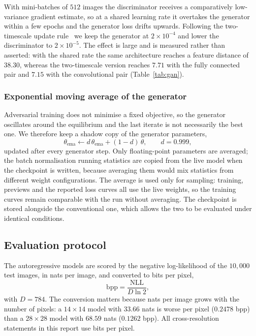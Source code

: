 \documentclass[11pt,a4paper]{article}
\begin{document}
With mini-batches of $512$ images the discriminator receives a comparatively low-variance
gradient estimate, so at a shared learning rate it overtakes the generator within a few epochs
and the generator loss drifts upwards. Following the two-timescale update
rule~\parencite{ttur2017} we keep the generator at $2\times10^{-4}$ and lower the
discriminator to $2\times10^{-5}$. The effect is large and is measured rather than asserted:
with the shared rate the same architecture reaches a feature distance of $38.30$, whereas the
two-timescale version reaches $7.71$ with the fully connected pair and $7.15$ with the
convolutional pair (Table~\ref{tab:gan}).

\subsubsection{Exponential moving average of the generator}

Adversarial training does not minimise a fixed objective, so the generator oscillates around
the equilibrium and the last iterate is not necessarily the best one. We therefore keep a
shadow copy of the generator parameters,
\begin{equation}
  \theta_{\text{ema}} \leftarrow d\,\theta_{\text{ema}} + (1-d)\,\theta,
  \qquad d = 0.999,
  \label{eq:ema}
\end{equation}
updated after every generator step. Only floating-point parameters are averaged; the batch
normalisation running statistics are copied from the live model when the checkpoint is written,
because averaging them would mix statistics from different weight configurations.
The average is used only for sampling: training, previews and the reported loss curves all use
the live weights, so the training curves remain comparable with the run without averaging.
The checkpoint is stored alongside the conventional one, which allows the two to be evaluated
under identical conditions.

\subsection{Evaluation protocol}
\label{sec:metrics}

The autoregressive models are scored by the negative log-likelihood of the $10{,}000$ test
images, in nats per image, and converted to bits per pixel,
\begin{equation}
  \text{bpp} = \frac{\text{NLL}}{D \ln 2},
  \label{eq:bpp}
\end{equation}
with $D=784$. The conversion matters because nats per image grows with the number of pixels:
a $14\times14$ model with $33.66$ nats is worse per pixel ($0.2478$ bpp) than a $28\times28$
model with $68.59$ nats ($0.1262$ bpp). All cross-resolution statements in this report use
bits per pixel.
\end{document}
